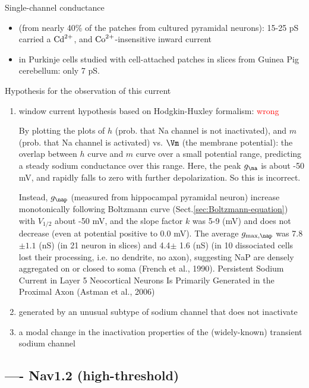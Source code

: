 Single-channel conductance 
\begin{itemize}
  \item  (from nearly 40\% of the patches from
  cultured pyramidal neurons): 15-25 pS carried a $\ce{Cd^2+}$, and
  $\ce{Co^2+}$-insensitive inward current
  
  \item in Purkinje cells studied with cell-attached patches in slices from
  Guinea Pig cerebellum: only 7 pS.
\end{itemize}


Hypothesis for the observation of this current
\begin{enumerate}
  \item window current hypothesis based on Hodgkin-Huxley formalism:
  \textcolor{red}{wrong}
  
By plotting the plots of $h$ (prob. that Na channel is not inactivated), and $m$
(prob. that Na channel is activated) vs. $\Vm$ (the membrane potential): the
overlap between $h$ curve and $m$ curve over a small potential range, predicting
a steady sodium conductance over this range. Here, the peak $g_\na$ is about -50
mV, and rapidly falls to zero with further depolarization. So this is incorrect.

Instead, $g_\nap$ (measured from hippocampal pyramidal neuron) increase
monotonically following Boltzmann curve (Sect.\ref{sec:Boltzmann-equation}) with
$V_{1/2}$ about -50 mV, and the slope factor $k$  was 5-9 (mV) and does not
decrease (even at potential positive to 0.0 mV). The average $g_{\max,\nap}$ was
7.8 $\pm 1.1$ (nS) (in 21 neuron in slices) and 4.4$\pm$ 1.6 (nS) (in 10
dissociated cells lost their processing, i.e. no dendrite, no axon), suggesting
NaP are densely aggregated on or closed to soma (French et al., 1990).
Persistent Sodium Current in Layer 5 Neocortical Neurons Is Primarily Generated
in the Proximal Axon (Astman et al., 2006)

  \item generated by an unusual subtype of sodium channel that does not
  inactivate


  \item a modal change in the inactivation properties of the (widely-known)
  transient sodium channel
\end{enumerate}


\subsection{---- Nav1.2 (high-threshold)}
\label{sec:Nav1.2}

